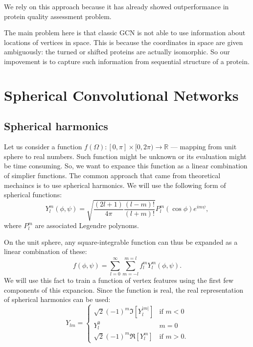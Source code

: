 \documentclass[12pt,twoside]{article}
\begin{document}
	We rely on this approach because it has already showed outperformance in protein quality
	 assessment problem\cite{Baldassarre2020GRAPHQAPM}.
	
	The main problem here is that classic GCN is not able to use information about locations of vertices in space. This is because the coordinates in space
	are given ambiguously: the turned or shifted proteins are actually isomorphic. So our impovement is to capture such information from
	sequential structure of a protein.

	\section{Spherical Convolutional Networks}
	\subsection{Spherical harmonics}
	Let us consider a function $f(\Omega) : [0, \pi] \times [0, 2\pi) \rightarrow \mathbb{R}$ — mapping from unit sphere to real
	numbers. Such function might be unknown or its evaluation might be time consuming. So, we want to expance this function as a linear
	combination of simplier functions. The common approach that came from theoretical mechaincs is to use spherical harmonics\cite{Mueller1966}.
	We will use the following form of spherical functions:
	$$
		Y_l^m(\phi, \psi) = \sqrt{\dfrac{(2l + 1)}{4\pi}\dfrac{(l-m)!}{(l+m)!}}P_l^m(\cos \phi)e^{im\psi}, 
	$$
	where $P_l^{m}$ are associated Legendre polynoms\cite{Mueller1966}.

	On the unit sphere, any square-integrable function can thus be expanded as a linear combination of these:
	$$
	f(\phi, \psi) = \sum_{l = 0}^{\infty} \sum_{m=-l}^{m=l}f_l^m Y_l^m(\phi, \psi).
	$$
	We will use this fact to train a function of vertex features using the first few components of this expancion. 
	Since the function is real, the real representation of spherical harmonics can be used:
	$$
	Y_{lm} = \begin{cases}
		\sqrt{2}(-1)^m \Im\left[Y_l^{|m|}\right] & \text{if } m < 0 \\
		Y_l^0 & m = 0 \\
		\sqrt{2}(-1)^m \Re\left[Y_l^{m}\right] & \text{if } m > 0.
	\end{cases}
	$$
\end{document}
